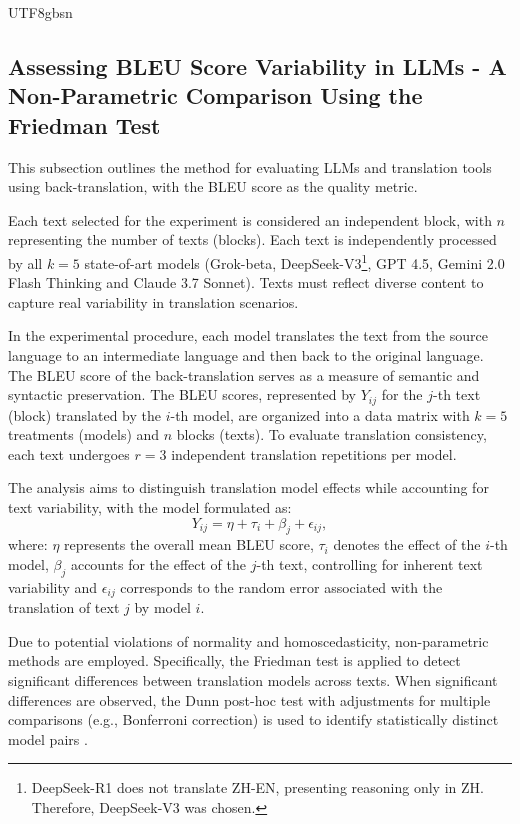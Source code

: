 \documentclass[conference]{IEEEtran}
\begin{document}
\begin{CJK*}{UTF8}{gbsn}
\color{blue}

\subsection{Assessing BLEU Score Variability in LLMs - A Non-Parametric Comparison Using the Friedman Test}

This subsection outlines the method for evaluating LLMs and translation tools using back-translation, with the BLEU score as the quality metric.

Each text selected for the experiment is considered an independent block, with \( n \) representing the number of texts (blocks). Each text is independently processed by all \( k = 5 \) state-of-art models (Grok-beta, DeepSeek-V3\footnote{DeepSeek-R1 does not translate ZH-EN, presenting reasoning only in ZH. Therefore, DeepSeek-V3 was chosen.}, GPT 4.5, Gemini 2.0 Flash Thinking and Claude 3.7 Sonnet). Texts must reflect diverse content to capture real variability in translation scenarios.

In the experimental procedure, each model translates the text from the source language to an intermediate language and then back to the original language. The BLEU score of the back-translation serves as a measure of semantic and syntactic preservation. The BLEU scores, represented by \( Y_{ij} \) for the \( j \)-th text (block) translated by the \( i \)-th model, are organized into a data matrix with \( k = 5 \) treatments (models) and \( n \) blocks (texts). To evaluate translation consistency, each text undergoes \( r = 3 \) independent translation repetitions per model.

The analysis aims to distinguish translation model effects while accounting for text variability, with the model formulated as:
\begin{equation}
    Y_{ij} = \eta + \tau_i + \beta_j + \epsilon_{ij},
\end{equation}
where:
\( \eta \) represents the overall mean BLEU score, \( \tau_i \) denotes the effect of the \( i \)-th model, \( \beta_j \) accounts for the effect of the \( j \)-th text, controlling for inherent text variability and \( \epsilon_{ij} \) corresponds to the random error associated with the translation of text \( j \) by model \( i \).

Due to potential violations of normality and homoscedasticity, non-parametric methods are employed. Specifically, the Friedman test is applied to detect significant differences between translation models across texts. When significant differences are observed, the Dunn post-hoc test with adjustments for multiple comparisons (e.g., Bonferroni correction) is used to identify statistically distinct model pairs \cite{Sheldon1996, Aqmal2024, Arruda2020, Nam2015}.


\end{CJK*}
\end{document}
